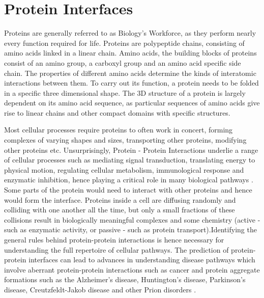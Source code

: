 \section{Protein Interfaces}
Proteins are generally referred to as Biology's Workforce, as they perform nearly every function required for life. Proteins are polypeptide chains, consisting of amino acids linked in a linear chain. Amino acids, the building blocks of proteins consist of an amino group, a carboxyl group and an amino acid specific side chain. The properties of different amino acids determine the kinds of interatomic interactions between them. To carry out its function, a protein needs to be folded in a specific three dimensional shape. The 3D structure of a protein is largely dependent on its amino acid sequence, as particular sequences of amino acids give rise to linear chains and other compact domains with specific structures.
\par 
Most cellular processes require proteins to often work in concert, forming complexes of varying shapes and sizes, transporting other proteins, modifying other proteins etc. Unsurprisingly, Protein - Protein Interactions underlie a range of cellular processes such as mediating signal transduction, translating energy to physical motion, regulating cellular metabolism, immunological response and enzymatic inhibition, hence playing a critical role in many biological pathways \citep{Braun2012}. Some parts of the protein would need to interact with other proteins and hence would form the interface. Proteins inside a cell are diffusing randomly and colliding with one another all the time, but only a small fractions of these collisions result in biologically meaningful complexes and some chemistry (active - such as enzymatic activity, or passive - such as protein transport).Identifying the general rules behind protein-protein interactions is hence necessary for understanding the full repertoire of cellular pathways. The prediction of protein-protein interfaces can lead to advances in understanding disease pathways which involve aberrant protein-protein interactions such as cancer \citep{Wong2003} and protein aggregate formations such as the Alzheimer's disease, Huntington's disease, Parkinson's disease, Creutzfeldt-Jakob disease and other Prion disorders \citep{Kaytor1999} .

